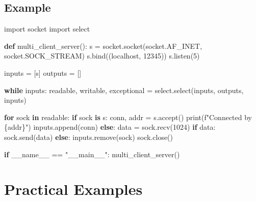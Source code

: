 \documentclass[
  letterpaper,
  DIV=11,
  numbers=noendperiod]{scrreprt}
\newenvironment{Shaded}{\begin{snugshade}}{\end{snugshade}}
\newcommand{\BuiltInTok}[1]{\textcolor[rgb]{0.00,0.23,0.31}{#1}}
\newcommand{\ControlFlowTok}[1]{\textcolor[rgb]{0.00,0.23,0.31}{\textbf{#1}}}
\newcommand{\DecValTok}[1]{\textcolor[rgb]{0.68,0.00,0.00}{#1}}
\newcommand{\ImportTok}[1]{\textcolor[rgb]{0.00,0.46,0.62}{#1}}
\newcommand{\KeywordTok}[1]{\textcolor[rgb]{0.00,0.23,0.31}{\textbf{#1}}}
\newcommand{\NormalTok}[1]{\textcolor[rgb]{0.00,0.23,0.31}{#1}}
\newcommand{\OperatorTok}[1]{\textcolor[rgb]{0.37,0.37,0.37}{#1}}
\newcommand{\SpecialCharTok}[1]{\textcolor[rgb]{0.37,0.37,0.37}{#1}}
\newcommand{\SpecialStringTok}[1]{\textcolor[rgb]{0.13,0.47,0.30}{#1}}
\newcommand{\StringTok}[1]{\textcolor[rgb]{0.13,0.47,0.30}{#1}}
\newcommand{\VariableTok}[1]{\textcolor[rgb]{0.07,0.07,0.07}{#1}}
\begin{document}
\subsection{Example}\label{example-58}

\begin{Shaded}
\begin{Highlighting}[]
\ImportTok{import}\NormalTok{ socket}
\ImportTok{import}\NormalTok{ select}

\KeywordTok{def}\NormalTok{ multi\_client\_server():}
\NormalTok{    s }\OperatorTok{=}\NormalTok{ socket.socket(socket.AF\_INET, socket.SOCK\_STREAM)}
\NormalTok{    s.bind((}\StringTok{\textquotesingle{}localhost\textquotesingle{}}\NormalTok{, }\DecValTok{12345}\NormalTok{))}
\NormalTok{    s.listen(}\DecValTok{5}\NormalTok{)}
    
\NormalTok{    inputs }\OperatorTok{=}\NormalTok{ [s]}
\NormalTok{    outputs }\OperatorTok{=}\NormalTok{ []}
    
    \ControlFlowTok{while}\NormalTok{ inputs:}
\NormalTok{        readable, writable, exceptional }\OperatorTok{=}\NormalTok{ select.select(inputs, outputs, inputs)}
        
        \ControlFlowTok{for}\NormalTok{ sock }\KeywordTok{in}\NormalTok{ readable:}
            \ControlFlowTok{if}\NormalTok{ sock }\KeywordTok{is}\NormalTok{ s:}
\NormalTok{                conn, addr }\OperatorTok{=}\NormalTok{ s.accept()}
                \BuiltInTok{print}\NormalTok{(}\SpecialStringTok{f"Connected by }\SpecialCharTok{\{}\NormalTok{addr}\SpecialCharTok{\}}\SpecialStringTok{"}\NormalTok{)}
\NormalTok{                inputs.append(conn)}
            \ControlFlowTok{else}\NormalTok{:}
\NormalTok{                data }\OperatorTok{=}\NormalTok{ sock.recv(}\DecValTok{1024}\NormalTok{)}
                \ControlFlowTok{if}\NormalTok{ data:}
\NormalTok{                    sock.send(data)}
                \ControlFlowTok{else}\NormalTok{:}
\NormalTok{                    inputs.remove(sock)}
\NormalTok{                    sock.close()}

\ControlFlowTok{if} \VariableTok{\_\_name\_\_} \OperatorTok{==} \StringTok{"\_\_main\_\_"}\NormalTok{:}
\NormalTok{    multi\_client\_server()}
\end{Highlighting}
\end{Shaded}

\section{Practical Examples}\label{practical-examples-9}
\end{document}
